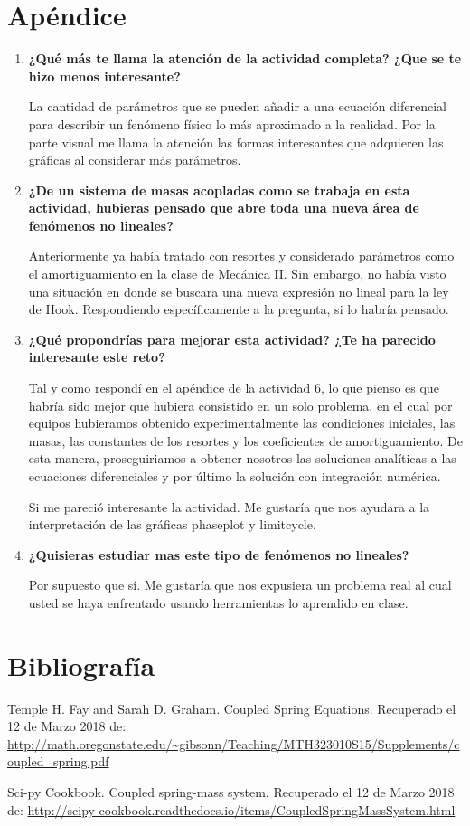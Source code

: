 \documentclass[a4paper]{article}
\begin{document}
\section{Apéndice}
\begin{enumerate}
\item \textbf{¿Qué más te llama la atención de la actividad completa? ¿Que se te hizo menos interesante?}


La cantidad de parámetros que se pueden añadir a una ecuación diferencial para describir un fenómeno físico lo más aproximado a la realidad.
Por la parte visual me llama la atención las formas interesantes que adquieren las gráficas al considerar más parámetros.


\item \textbf{¿De un sistema de masas acopladas como se trabaja en esta actividad, hubieras pensado que abre toda una nueva área de fenómenos no lineales?}

Anteriormente ya había tratado con resortes y considerado parámetros como el amortiguamiento en la clase de Mecánica II. Sin embargo, no había visto una situación en donde se buscara una nueva expresión no lineal para la ley de Hook. Respondiendo específicamente a la pregunta, si lo habría pensado. 

\item \textbf{¿Qué propondrías para mejorar esta actividad? ¿Te ha parecido interesante este reto?}

Tal y como respondí en el apéndice de la actividad 6, lo que pienso es que habría sido mejor que hubiera consistido en un solo problema, en el cual por equipos hubieramos obtenido experimentalmente las condiciones iniciales, las masas, las constantes de los resortes y los coeficientes de amortiguamiento. De esta manera, proseguiriamos a obtener nosotros las soluciones analíticas a las ecuaciones diferenciales y por último la solución con integración numérica. 

Si me pareció interesante la actividad. Me gustaría que nos ayudara a la interpretación de las gráficas phaseplot y limitcycle.


\item \textbf{¿Quisieras estudiar mas este tipo de fenómenos no lineales?}

Por supuesto que sí. Me gustaría que nos expusiera un problema real al cual usted se haya enfrentado usando herramientas lo aprendido en clase. 


\end{enumerate}

\section{Bibliografía}
\noindent
Temple H. Fay and Sarah D. Graham. Coupled Spring Equations. Recuperado el 12 de Marzo 2018 de: \url{http://math.oregonstate.edu/~gibsonn/Teaching/MTH323010S15/Supplements/coupled_spring.pdf}

Sci-py Cookbook. Coupled spring-mass system. Recuperado el 12 de Marzo 2018 de: \url {http://scipy-cookbook.readthedocs.io/items/CoupledSpringMassSystem.html}
\end{document}
